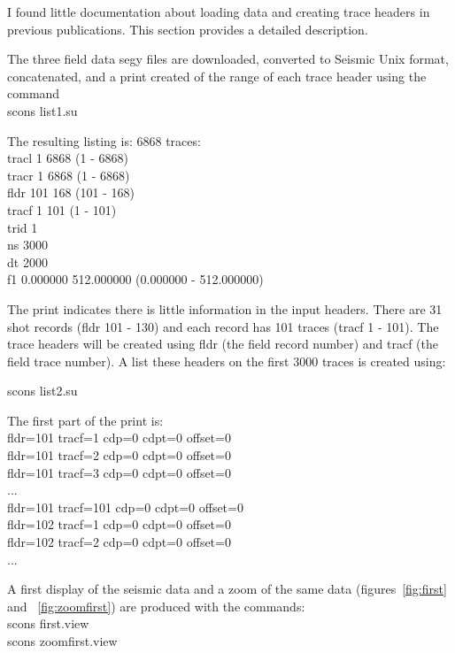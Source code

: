 I found little documentation about loading data and creating trace
headers in previous publications.  This section provides a detailed
description.

The three field data segy files are downloaded, converted to Seismic 
Unix format, concatenated, and a print created of the range of each trace 
header using the command\\

scons list1.su

The resulting listing is:
6868 traces:\\
tracl    1 6868 (1 - 6868)\\
tracr    1 6868 (1 - 6868)\\
fldr     101 168 (101 - 168)\\
tracf    1 101 (1 - 101)\\
trid     1\\
ns       3000\\
dt       2000\\
f1       0.000000 512.000000 (0.000000 - 512.000000)

The print indicates there is little information in the input headers.
There are 31 shot records (fldr 101 - 130) and each record has 101
traces (tracf 1 - 101).  The trace headers will be created using fldr
(the field record number) and tracf (the field trace number).  A list 
these headers on the first 3000 traces is created using:

scons list2.su 

The first part of the print is: \\
fldr=101 tracf=1  cdp=0	 cdpt=0  offset=0 \\
fldr=101 tracf=2  cdp=0	 cdpt=0  offset=0 \\	
fldr=101 tracf=3  cdp=0  cdpt=0  offset=0 \\
... \\
fldr=101 tracf=101  cdp=0  cdpt=0  offset=0 \\
fldr=102 tracf=1    cdp=0  cdpt=0  offset=0 \\
fldr=102 tracf=2    cdp=0  cdpt=0  offset=0 \\
...

A first display of the seismic data and a zoom of the same data 
(figures~\ref{fig:first} and ~\ref{fig:zoomfirst}) are
produced with the commands: \\
scons first.view \\
scons zoomfirst.view


